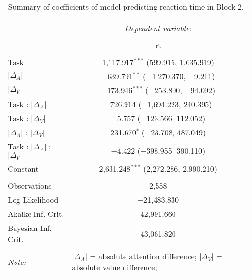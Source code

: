 
\begin{table}[t] \centering 
  \caption{Summary of coefficients of model predicting reaction time in Block 2.} 
  \label{table:rtModelBlock2} 
\begin{tabular}{@{\extracolsep{5pt}}lc} 
\\[-1.8ex]\hline 
\hline \\[-1.8ex] 
 & \multicolumn{1}{c}{\textit{Dependent variable:}} \\ 
\cline{2-2} 
\\[-1.8ex] & rt \\ 
\hline \\[-1.8ex] 
 Task & 1,117.917$^{***}$ (599.915, 1,635.919) \\ 
  $\vert\Delta_A\vert$ & $-$639.791$^{**}$ ($-$1,270.370, $-$9.211) \\ 
  $\vert\Delta_V\vert$ & $-$173.946$^{***}$ ($-$253.800, $-$94.092) \\ 
  Task : $\vert\Delta_A\vert$ & $-$726.914 ($-$1,694.223, 240.395) \\ 
  Task : $\vert\Delta_V\vert$ & $-$5.757 ($-$123.566, 112.052) \\ 
  $\vert\Delta_A\vert$ : $\vert\Delta_V\vert$ & 231.670$^{*}$ ($-$23.708, 487.049) \\ 
  Task : $\vert\Delta_A\vert$ :  $\vert\Delta_V\vert$ & $-$4.422 ($-$398.955, 390.110) \\ 
  Constant & 2,631.248$^{***}$ (2,272.286, 2,990.210) \\ 
 \hline \\[-1.8ex] 
Observations & 2,558 \\ 
Log Likelihood & $-$21,483.830 \\ 
Akaike Inf. Crit. & 42,991.660 \\ 
Bayesian Inf. Crit. & 43,061.820 \\ 
\hline 
\hline \\[-1.8ex] 
\textit{Note:}  & \multicolumn{1}{l}{\footnotesize $\vert\Delta_A\vert$ = absolute attention difference; $\vert\Delta_V\vert$ = absolute value difference; } \\ 
\end{tabular} 
\end{table} 
